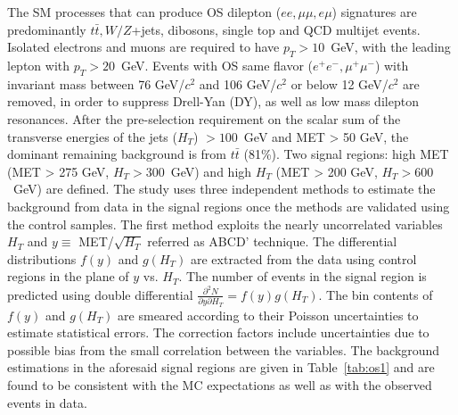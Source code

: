 \documentclass{PoS}
\begin{document}
The SM processes that can produce OS dilepton ($ee, \mu\mu, e\mu$) signatures are predominantly $t\bar{t}, W/Z$+jets, dibosons, single top and 
QCD multijet events. Isolated electrons and muons are required to have $p_T > 10$~GeV, with the leading lepton with $p_T > 20$~GeV. Events with OS same 
flavor ($e^+e^-, \mu^+\mu^-$) with invariant mass between 76 GeV/$c^2$ and 106 GeV/$c^2$ or below 12 GeV/$c^2$ are removed, in order to suppress Drell-Yan (DY), 
as well as low mass dilepton resonances. After the pre-selection requirement on the scalar sum of the transverse energies of the jets ($H_T$) $> 100$~GeV and 
MET > 50 GeV, the dominant remaining background is from $t\bar{t}$ (81\%). Two signal regions: high MET (MET > 275 GeV, $H_T > 300$~GeV) and 
high $H_T$ (MET > 200 GeV, $H_T > 600$~GeV) are defined. The study uses three independent methods to estimate the background from data in the signal 
regions once the methods are validated using the control samples. The first method exploits the nearly uncorrelated variables $H_T$ and $y \equiv$ 
MET/$\sqrt{H_T}$ referred as ABCD' technique. The differential distributions $f(y)$ and $g(H_T)$ are extracted from the data using control regions 
in the plane of $y$ vs. $H_T$. The number of events in the signal region is predicted using double differential 
$\frac{\partial^2 N}{\partial y \partial H_T} = f(y) g(H_T)$. The bin contents of $f(y)$ and $g(H_T)$ are smeared according to their Poisson uncertainties
to estimate statistical errors. The correction factors include uncertainties due to possible bias from the small correlation between 
the variables. The background estimations in the aforesaid signal regions are given in Table~\ref{tab:os1} and are found to be consistent with 
the MC expectations as well as with the observed events in data. 
\end{document}
